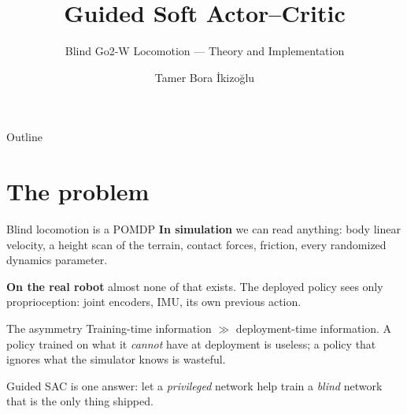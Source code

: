 \documentclass[aspectratio=169]{beamer}
\title{Guided Soft Actor--Critic}
\subtitle{Blind Go2-W Locomotion --- Theory and Implementation}
\author{Tamer Bora İkizoğlu}
\institute{Istanbul Technical University}
\date{}
\begin{document}
\maketitle

\begin{frame}{Outline}
  \tableofcontents
\end{frame}

\section{The problem}

\begin{frame}{Blind locomotion is a POMDP}
  \textbf{In simulation} we can read anything: body linear velocity, a height scan of
  the terrain, contact forces, friction, every randomized dynamics parameter.

  \textbf{On the real robot} almost none of that exists. The deployed policy sees only
  proprioception: joint encoders, IMU, its own previous action.

  \vspace{0.6em}
  \begin{alertblock}{The asymmetry}
    Training-time information $\gg$ deployment-time information. A policy trained on
    what it \emph{cannot} have at deployment is useless; a policy that ignores what the
    simulator knows is wasteful.
  \end{alertblock}

  \vspace{0.4em}
  Guided SAC is one answer: let a \emph{privileged} network help train a \emph{blind}
  network that is the only thing shipped.
\end{frame}
\end{document}
